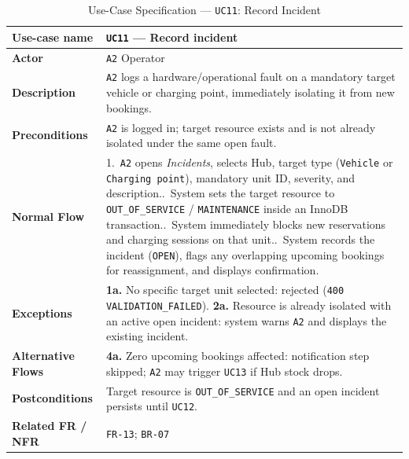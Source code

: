 \begin{table}[H]
  \centering
  \singlespacing\footnotesize
  \caption{Use-Case Specification --- \texttt{UC11}: Record Incident}
  \label{tab:uc11}
  \renewcommand{\arraystretch}{1.13}
  \begin{tabularx}{\textwidth}{|L{2.9cm}|Y|}
    \hline
    \textbf{Use-case name} & \textbf{\texttt{UC11} --- Record incident} \\
    \hline
    \textbf{Actor} & \texttt{A2} Operator \\
    \hline
    \textbf{Description} & \texttt{A2} logs a hardware/operational fault on a mandatory target vehicle or charging point, immediately isolating it from new bookings. \\
    \hline
    \textbf{Preconditions} & \texttt{A2} is logged in; target resource exists and is not already isolated under the same open fault. \\
    \hline
    \textbf{Normal Flow} & 1.\ \texttt{A2} opens \textit{Incidents}, selects Hub, target type (\texttt{Vehicle} or \texttt{Charging point}), mandatory unit ID, severity, and description..\ System sets the target resource to \texttt{OUT\_\allowbreak OF\_\allowbreak SERVICE} / \texttt{MAINTENANCE} inside an InnoDB transaction..\ System immediately blocks new reservations and charging sessions on that unit..\ System records the incident (\texttt{OPEN}), flags any overlapping upcoming bookings for reassignment, and displays confirmation. \\
    \hline
    \textbf{Exceptions} & \textbf{1a.} No specific target unit selected: rejected (\texttt{400 VALIDATION\_\allowbreak FAILED}).\newline
    \textbf{2a.} Resource is already isolated with an active open incident: system warns \texttt{A2} and displays the existing incident. \\
    \hline
    \textbf{Alternative Flows} & \textbf{4a.} Zero upcoming bookings affected: notification step skipped; \texttt{A2} may trigger \texttt{UC13} if Hub stock drops. \\
    \hline
    \textbf{Postconditions} & Target resource is \texttt{OUT\_\allowbreak OF\_\allowbreak SERVICE} and an open incident persists until \texttt{UC12}. \\
    \hline
    \textbf{Related FR / NFR} & \texttt{FR-13}; \texttt{BR-07} \\
    \hline
  \end{tabularx}
\end{table}


